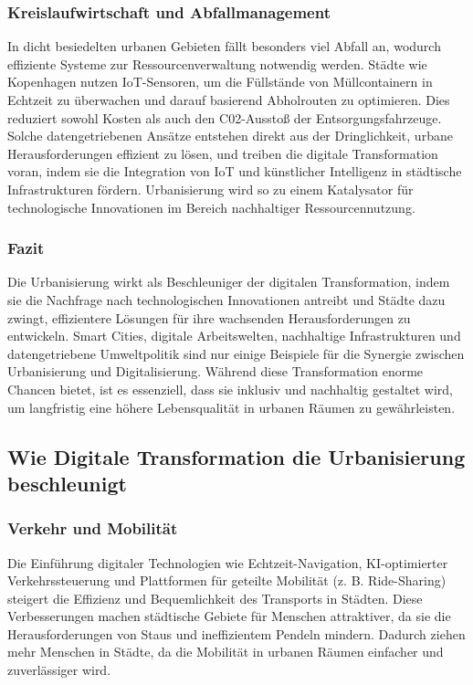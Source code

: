\documentclass[conference,compsoc,final,a4paper, onecolumn, 11pt]{IEEEtran}
\begin{document}
\subsubsection{Kreislaufwirtschaft und Abfallmanagement}
In dicht besiedelten urbanen Gebieten fällt besonders viel Abfall an, wodurch effiziente Systeme zur Ressourcenverwaltung notwendig werden. 
Städte wie Kopenhagen nutzen \ac{IoT}-Sensoren, um die Füllstände von Müllcontainern in Echtzeit zu überwachen und darauf basierend Abholrouten zu optimieren. 
Dies reduziert sowohl Kosten als auch den C02-Ausstoß der Entsorgungsfahrzeuge. 
Solche datengetriebenen Ansätze entstehen direkt aus der Dringlichkeit, urbane Herausforderungen effizient zu lösen, und treiben die digitale Transformation voran, indem sie die Integration von IoT und künstlicher Intelligenz in städtische Infrastrukturen fördern. 
Urbanisierung wird so zu einem Katalysator für technologische Innovationen im Bereich nachhaltiger Ressourcennutzung.\autocite{mdpi_smart_cities_iot}


\subsubsection{Fazit}
Die Urbanisierung wirkt als Beschleuniger der digitalen Transformation, indem sie die Nachfrage nach technologischen Innovationen antreibt und Städte dazu zwingt, effizientere Lösungen für ihre wachsenden Herausforderungen zu entwickeln. 
Smart Cities, digitale Arbeitswelten, nachhaltige Infrastrukturen und datengetriebene Umweltpolitik sind nur einige Beispiele für die Synergie zwischen Urbanisierung und Digitalisierung. 
Während diese Transformation enorme Chancen bietet, ist es essenziell, dass sie inklusiv und nachhaltig gestaltet wird, um langfristig eine höhere Lebensqualität in urbanen Räumen zu gewährleisten.


\subsection{Wie Digitale Transformation die Urbanisierung beschleunigt}
\subsubsection{ Verkehr und Mobilität}
Die Einführung digitaler Technologien wie Echtzeit-Navigation, \ac{KI}-optimierter Verkehrssteuerung und Plattformen für geteilte Mobilität (z. B. Ride-Sharing) steigert die Effizienz und Bequemlichkeit des Transports in Städten. 
Diese Verbesserungen machen städtische Gebiete für Menschen attraktiver, da sie die Herausforderungen von Staus und ineffizientem Pendeln mindern. 
Dadurch ziehen mehr Menschen in Städte, da die Mobilität in urbanen Räumen einfacher und zuverlässiger wird.\autocite{mckinsey_smart_cities}
\end{document}
